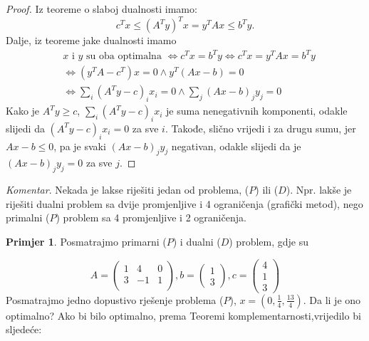 \documentclass[a4paper, utf8, 11pt, colorlinks]{book}
\theoremstyle{definition}
\newtheorem{primjer}{Primjer}[chapter]
\begin{document}
\begin{proof}
         Iz teoreme o slaboj dualnosti imamo:  
         \begin{equation} 
             c^Tx \leq ( A^T y)^T x = y^T A x \leq b^T y.  
         \end{equation} 
         Dalje, iz teoreme jake dualnosti imamo   
         \begin{align*} 
             &x \mbox{ i } y \mbox{ su oba optimalna } \Longleftrightarrow c^T x = b^T y  \Longleftrightarrow c^Tx = y^TA x = b^Ty \\ 
             &\Longleftrightarrow (y^T A - c^T) x = 0 \wedge y^T(Ax - b )  = 0\\ 
             & \Longleftrightarrow \sum_i (A^T y - c)_i x_i = 0 \wedge \sum_j (Ax - b)_j y_j = 0 
         \end{align*} 
         Kako je $A^Ty \geq c$, $\sum_i (A^T y - c)_i x_i$ je suma nenegativnih komponenti, odakle  slijedi da   $(A^T y - c)_i x_i= 0$ za sve $i$. Takođe, slično vrijedi i za drugu sumu, jer $Ax - b \leq 0$, pa je svaki  $(Ax - b)_j y_j$ negativan, odakle slijedi da je $(Ax - b)_j y_j = 0$ za sve $j$.
\end{proof} 

\emph{Komentar}.  Nekada je lakse riješiti jedan od problema, ($P$)  ili  ($D$).  Npr. lakše je riješiti dualni problem sa dvije promjenljive i 4 ograničenja (grafički metod), nego primalni  ($P$)  problem sa 4 promjenljive i 2 ograničenja. 

\begin{primjer} Posmatrajmo primarni  ($P$)  i dualni ($D$) problem, gdje su
	\end{primjer}
 
$$      A = \left(\begin{array}{ccc}
          1 &  4 & 0 \\
          3 & -1 & 1 \\
      \end{array} \right ), b = \left (\begin{array}{c}
           1 \\
           3
      \end{array}\right ), c =\left ( \begin{array}{c}
           4  \\
           1  \\
           3
      \end{array} \right )
 $$
Posmatrajmo jedno dopustivo rješenje problema  ($P$), $x = (0, \frac{1}{4}, \frac{13}{4})$. Da li je ono optimalno? Ako bi bilo optimalno,  prema Teoremi komplementarnosti,vrijedilo bi sljedeće:
\end{document}
